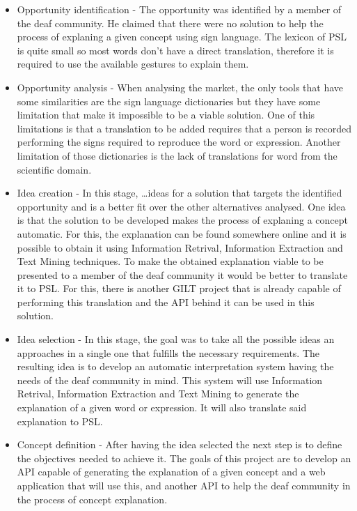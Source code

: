 \begin{itemize}
    \item Opportunity identification - The opportunity was identified by a member of the deaf community.
    He claimed that there were no solution to help the process of explaning a given concept using sign language.
    The lexicon of \gls{PSL} is quite small so most words don't have a direct translation, therefore it is required to use the available gestures to explain them.

    \item Opportunity analysis - When analysing the market, the only tools that have some similarities are the sign language dictionaries but they have some limitation that make it impossible to be a viable solution.
    One of this limitations is that a translation to be added requires that a person is recorded performing the signs required to reproduce the word or expression.
    Another limitation of those dictionaries is the lack of translations for word from the scientific domain.

    \item Idea creation - In this stage, \dots ideas for a solution that targets the identified opportunity and is a better fit over the other alternatives analysed.
    One idea is that the solution to be developed makes the process of explaning a concept automatic.
    For this, the explanation can be found somewhere online and it is possible to obtain it using Information Retrival, Information Extraction and Text Mining techniques.
    To make the obtained explanation viable to be presented to a member of the deaf community it would be better to translate it to \gls{PSL}.
    For this, there is another GILT project that is already capable of performing this translation and the \gls{API} behind it can be used in this solution.

    \item Idea selection - In this stage, the goal was to take all the possible ideas an approaches in a single one that fulfills the necessary requirements.
    The resulting idea is to develop an automatic interpretation system having the needs of the deaf community in mind.
    This system will use Information Retrival, Information Extraction and Text Mining to generate the explanation of a given word or expression.
    It will also translate said explanation to \gls{PSL}.

    \item Concept definition - After having the idea selected the next step is to define the objectives needed to achieve it.
    The goals of this project are to develop an \gls{API} capable of generating the explanation of a given concept and a web application that will use this, and another \gls{API} to help the deaf community in the process of concept explanation. 

\end{itemize}

